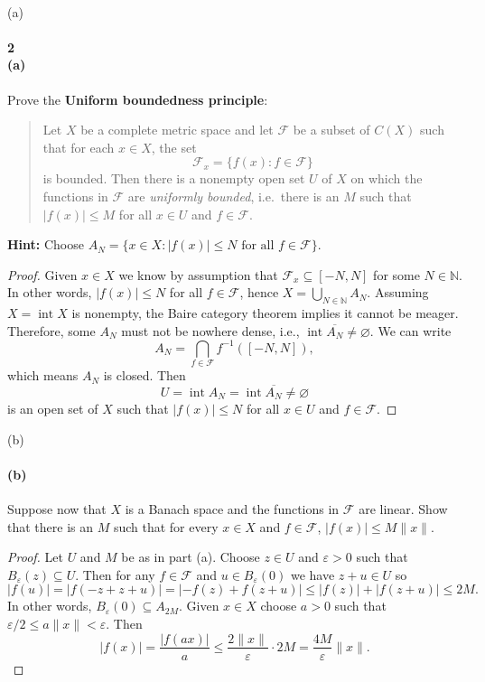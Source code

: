 \documentclass[12pt]{article}
\newlength{\myparskip}
\newenvironment{fullbox}{\begin{lrbox}{\savefullbox}\begin{minipage}{\dimexpr\textwidth-2\fboxsep\relax}\setlength{\parskip}{\myparskip}}{\end{minipage}\end{lrbox}\framebox[\textwidth]{\usebox{\savefullbox}}}
\newenvironment{pbox}[1][]{\begin{fullbox}\ifx#1\empty\else\paragraph{#1}\phantom{}\fi}{\end{fullbox}}
\theoremstyle{definition}
\newcommand{\N}{\mathbb{N}}
\newcommand{\eps}{\varepsilon}
\renewcommand{\emptyset}{\varnothing}
\newcommand{\<}{\langle}
\renewcommand{\>}{\rangle}
\newcommand{\clo}{\overline}
\newcommand{\FF}{\mathcal{F}}
\DeclareMathOperator{\inter}{int}
\begin{document}
\newpage
\begin{pbox}[2 \\ (a)]
    Prove the \textbf{Uniform boundedness principle}:
    \begin{quote}
      Let $X$ be a complete metric space and let $\mathcal F$ be a subset of
      $C(X)$ such that for each $x \in X$, the set
      \[\mathcal F_x=\{f(x) : f \in \mathcal F\}\]
      is bounded.  Then there is a nonempty open set $U$ of $X$ on which the
      functions in $\mathcal F$ are \emph{uniformly bounded}, i.e.~there is an
      $M$ such that $|f(x)| \leq M$ for all $x \in U$ and $f \in \mathcal F$.
    \end{quote}
    \textbf{Hint:} Choose $A_N=\{x \in X: \lvert f(x) \rvert \leq N\text{ for all }f \in \mathcal F\}$.
\end{pbox}

\begin{proof}
    Given $x \in X$ we know by assumption that $\FF_x \subseteq [-N, N]$ for some $N \in \N$.
    In other words, $|f(x)| \leq N$ for all $f \in \FF$, hence $X = \bigcup_{N \in \N} A_N$.
    Assuming $X = \inter X$ is nonempty, the Baire category theorem implies it cannot be meager.
    Therefore, some $A_N$ must not be nowhere dense, i.e., $\inter \clo{A_N} \ne \emptyset$.
    We can write
    \[
        A_N = \bigcap_{f \in \FF} f^{-1}([-N, N]),
    \]
    which means $A_N$ is closed.
    Then
    \[
        U = \inter A_N = \inter\clo{A_N} \ne \emptyset
    \]
    is an open set of $X$ such that $|f(x)| \leq N$ for all $x \in U$ and $f \in \FF$.
\end{proof}

\begin{pbox}[(b)]
    Suppose now that $X$ is a Banach space and the functions in $\mathcal F$
    are linear.  Show that there is an $M$ such that for every $x \in X$ and
    $f \in \mathcal F$, $|f(x)| \leq M\lVert x \rVert$.
\end{pbox}

\begin{proof}
    Let $U$ and $M$ be as in part (a).
    Choose $z \in U$ and $\eps > 0$ such that $B_\eps(z) \subseteq U$.
    Then for any $f \in \FF$ and $u \in B_\eps(0)$ we have $z + u \in U$ so
    \[
        |f(u)|
            = |f(-z + z + u)|
            = |-f(z) + f(z + u)|
            \leq |f(z)| + |f(z + u)|
            \leq 2M.
    \]
    In other words, $B_\eps(0) \subseteq A_{2M}$.
    Given $x \in X$ choose $a > 0$ such that $\eps/2 \leq a\|x\| < \eps$.
    Then
    \[
        |f(x)|
            = \frac{|f(ax)|}{a}
            \leq \frac{2\|x\|}{\eps} \cdot 2M
            = \frac{4M}{\eps}\|x\|.
    \]

\end{proof}
\end{document}
